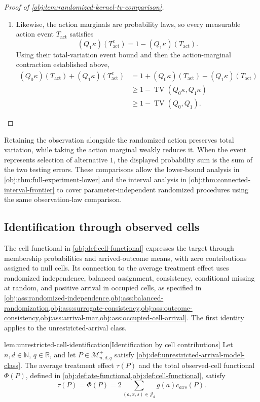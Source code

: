 \documentclass[11pt]{article}
\begin{document}
\begin{proof}[Proof of \cref{obj:lem:randomized-kernel-tv-comparison}]
\begin{enumerate}
\item Likewise, the action marginals are probability laws, so every measurable action event \(T_{\mathrm{act}}\) satisfies
\[
(Q_1\kappa)(T_{\mathrm{act}}^c)
=
1-(Q_1\kappa)(T_{\mathrm{act}}).
\]
Using their total-variation event bound and then the action-marginal contraction established above,
\[
\begin{aligned}
(Q_0\kappa)(T_{\mathrm{act}})
 +(Q_1\kappa)(T_{\mathrm{act}}^c)
&=
1+(Q_0\kappa)(T_{\mathrm{act}})
 -(Q_1\kappa)(T_{\mathrm{act}})\\
&\ge
1-\operatorname{TV}(Q_0\kappa,Q_1\kappa)\\
&\ge
1-\operatorname{TV}(Q_0,Q_1).
\end{aligned}
\]
\end{enumerate}
\end{proof}

Retaining the observation alongside the randomized action preserves total variation, while taking the action marginal weakly reduces it. When the event represents selection of alternative \(1\), the displayed probability sum is the sum of the two testing errors. These comparisons allow the lower-bound analysis in \cref{obj:thm:full-experiment-lower} and the interval analysis in \cref{obj:thm:connected-interval-frontier} to cover parameter-independent randomized procedures using the same observation-law comparison.

\subsection{Identification through observed cells}

The cell functional in \cref{obj:def:cell-functional} expresses the target through membership probabilities and arrived-outcome means, with zero contributions assigned to null cells. Its connection to the average treatment effect uses randomized independence, balanced assignment, consistency, conditional missing at random, and positive arrival in occupied cells, as specified in \cref{obj:ass:randomized-independence,obj:ass:balanced-randomization,obj:ass:surrogate-consistency,obj:ass:outcome-consistency,obj:ass:arrival-mar,obj:ass:occupied-cell-arrival}. The first identity applies to the unrestricted-arrival class.

\begin{lemmav}{lem:unrestricted-cell-identification}[Identification by cell contributions]
Let \(n,d\in\mathbb N\), \(q\in\mathbb R\), and let \(P\in\mathcal M^{+}_{n,d,q}\) satisfy \cref{obj:def:unrestricted-arrival-model-class}. The average treatment effect \(\tau(P)\) and the total observed-cell functional \(\Phi(P)\), defined in \cref{obj:def:ate-functional,obj:def:cell-functional}, satisfy
\[
\tau(P)=\Phi(P)
=2\sum_{(a,x,s)\in\mathcal J_d}g(a)c_{axs}(P).
\]
\end{lemmav}
\end{document}
